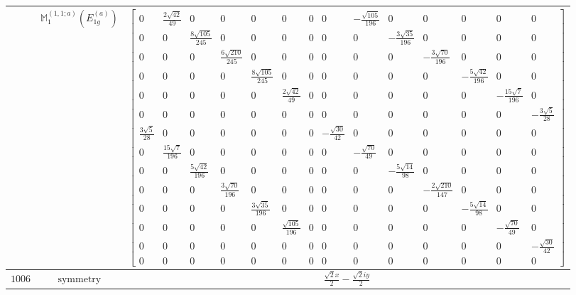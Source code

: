 \documentclass[fleqn,8pt,landscape]{jsarticle}
\begin{document}
\begin{longtable}{ccc}
$  $ & $ \mathbb{M}_{1}^{(1,1;a)}(E_{1g}^{(a)}) $ & $ \begin{bmatrix} 0 & \frac{2 \sqrt{42}}{49} & 0 & 0 & 0 & 0 & 0 & 0 & - \frac{\sqrt{105}}{196} & 0 & 0 & 0 & 0 & 0 \\ 0 & 0 & \frac{8 \sqrt{105}}{245} & 0 & 0 & 0 & 0 & 0 & 0 & - \frac{3 \sqrt{35}}{196} & 0 & 0 & 0 & 0 \\ 0 & 0 & 0 & \frac{6 \sqrt{210}}{245} & 0 & 0 & 0 & 0 & 0 & 0 & - \frac{3 \sqrt{70}}{196} & 0 & 0 & 0 \\ 0 & 0 & 0 & 0 & \frac{8 \sqrt{105}}{245} & 0 & 0 & 0 & 0 & 0 & 0 & - \frac{5 \sqrt{42}}{196} & 0 & 0 \\ 0 & 0 & 0 & 0 & 0 & \frac{2 \sqrt{42}}{49} & 0 & 0 & 0 & 0 & 0 & 0 & - \frac{15 \sqrt{7}}{196} & 0 \\ 0 & 0 & 0 & 0 & 0 & 0 & 0 & 0 & 0 & 0 & 0 & 0 & 0 & - \frac{3 \sqrt{5}}{28} \\ \frac{3 \sqrt{5}}{28} & 0 & 0 & 0 & 0 & 0 & 0 & - \frac{\sqrt{30}}{42} & 0 & 0 & 0 & 0 & 0 & 0 \\ 0 & \frac{15 \sqrt{7}}{196} & 0 & 0 & 0 & 0 & 0 & 0 & - \frac{\sqrt{70}}{49} & 0 & 0 & 0 & 0 & 0 \\ 0 & 0 & \frac{5 \sqrt{42}}{196} & 0 & 0 & 0 & 0 & 0 & 0 & - \frac{5 \sqrt{14}}{98} & 0 & 0 & 0 & 0 \\ 0 & 0 & 0 & \frac{3 \sqrt{70}}{196} & 0 & 0 & 0 & 0 & 0 & 0 & - \frac{2 \sqrt{210}}{147} & 0 & 0 & 0 \\ 0 & 0 & 0 & 0 & \frac{3 \sqrt{35}}{196} & 0 & 0 & 0 & 0 & 0 & 0 & - \frac{5 \sqrt{14}}{98} & 0 & 0 \\ 0 & 0 & 0 & 0 & 0 & \frac{\sqrt{105}}{196} & 0 & 0 & 0 & 0 & 0 & 0 & - \frac{\sqrt{70}}{49} & 0 \\ 0 & 0 & 0 & 0 & 0 & 0 & 0 & 0 & 0 & 0 & 0 & 0 & 0 & - \frac{\sqrt{30}}{42} \\ 0 & 0 & 0 & 0 & 0 & 0 & 0 & 0 & 0 & 0 & 0 & 0 & 0 & 0 \end{bmatrix} $ \\ \hline
$ 1006 $ & $ \text{symmetry} $ & $ \frac{\sqrt{2} x}{2} - \frac{\sqrt{2} i y}{2} $ \\

\end{longtable}
\end{document}

